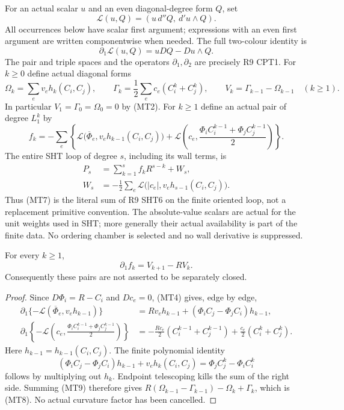 For an actual scalar $u$ and an even diagonal-degree form $Q$, set
\[
 \mathcal L(u,Q)=(u\,d''Q,\ d'u\wedge Q).
 \tag{MT3}
\]
All occurrences below have scalar first argument; expressions with
an even first argument are written componentwise when needed.  The
full two-colour identity is
\[
 \partial_1\mathcal L(u,Q)=uDQ-Du\wedge Q.
 \tag{MT4}
\]
The pair and triple spaces and the operators $\partial_1,\partial_2$
are precisely R9 CPT1.  For $k\ge0$ define actual diagonal forms
\[
 \Omega_k=\sum_e v_eh_k(C_i,C_j),\qquad
 \Gamma_k=\frac12\sum_e c_e(C_i^k+C_j^k),\qquad
 V_k=\Gamma_{k-1}-\Omega_{k-1}\quad(k\ge1).
 \tag{MT5}
\]
In particular $V_1=\Gamma_0=\Omega_0=0$ by (MT2).  For $k\ge1$
define an actual pair of degree $L_1^k$ by
\[
 f_k=-\sum_e\left\{
 \mathcal L\bigl(\overline\Phi_e,
                         v_eh_{k-1}(C_i,C_j)\bigr)
 +\mathcal L\left(c_e,
             \frac{\Phi_iC_i^{k-1}+\Phi_jC_j^{k-1}}2\right)
                      \right\}.
 \tag{MT6}
\]
The entire SHT loop of degree $s$, including its wall terms, is
\[
 \begin{split}
 P_s&=\sum_{k=1}^s f_kR^{s-k}+W_s,\\
 W_s&=-\frac12\sum_e
                 \mathcal L\bigl(|c_e|,v_eh_{s-1}(C_i,C_j)\bigr).
 \end{split}
 \tag{MT7}
\]
Thus (MT7) is the literal sum of R9 SHT6 on the finite oriented loop,
not a replacement primitive convention.  The absolute-value scalars
are actual for the unit weights used in SHT; more generally their
actual availability is part of the finite data.  No ordering chamber
is selected and no wall derivative is suppressed.

\begin{lemma}
For every $k\ge1$,
\[
                 \partial_1f_k=V_{k+1}-RV_k.
 \tag{MT8}
\]
Consequently these pairs are not asserted to be separately closed.
\end{lemma}

\begin{proof}
Since $D\Phi_i=R-C_i$ and $Dc_e=0$, (MT4) gives, edge by edge,
\[
 \begin{split}
 \partial_1\{-\mathcal L(\overline\Phi_e,v_eh_{k-1})\}
    &=Rv_eh_{k-1}
             +(\Phi_iC_j-\Phi_jC_i)h_{k-1},\\
 \partial_1\left\{-\mathcal L\left(c_e,
             \frac{\Phi_iC_i^{k-1}+\Phi_jC_j^{k-1}}2\right)\right\}
    &=-\frac{Rc_e}{2}(C_i^{k-1}+C_j^{k-1})
                        +\frac{c_e}{2}(C_i^k+C_j^k).
 \end{split}
 \tag{MT9}
\]
Here $h_{k-1}=h_{k-1}(C_i,C_j)$.  The finite polynomial identity
\[
 (\Phi_iC_j-\Phi_jC_i)h_{k-1}
       +v_eh_k(C_i,C_j)=\Phi_jC_j^k-\Phi_iC_i^k
 \tag{MT10}
\]
follows by multiplying out $h_k$.  Endpoint telescoping kills the
sum of the right side.  Summing (MT9) therefore gives
$R(\Omega_{k-1}-\Gamma_{k-1})-\Omega_k+\Gamma_k$, which is (MT8).
No actual curvature factor has been cancelled.
\end{proof}


